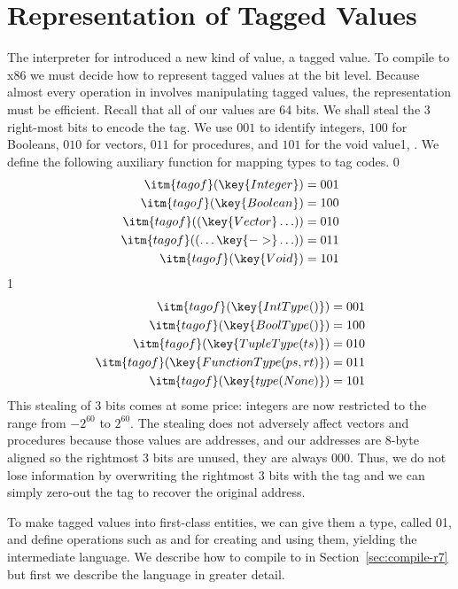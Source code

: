 \documentclass[7x10,nocrop]{TimesAPriori_MIT}%
\def\racketEd{0}
\def\pythonEd{1}
\def\edition{0}
\newcommand{\racket}[1]{{\if\edition\racketEd{#1}\fi}}
\newcommand{\python}[1]{{\if\edition\pythonEd #1\fi}}
\begin{document}
\clearpage

\section{Representation of Tagged Values}

The interpreter for \LangDyn{} introduced a new kind of value, a tagged
value. To compile \LangDyn{} to x86 we must decide how to represent tagged
values at the bit level. Because almost every operation in \LangDyn{}
involves manipulating tagged values, the representation must be
efficient. Recall that all of our values are 64 bits.  We shall steal
the 3 right-most bits to encode the tag.  We use $001$ to identify
integers, $100$ for Booleans, $010$ for vectors, $011$ for procedures,
and $101$ for the void value\python{, }. We define the following auxiliary
function for mapping types to tag codes.
{\if\edition\racketEd
\begin{align*}
\itm{tagof}(\key{Integer}) &= 001 \\
\itm{tagof}(\key{Boolean}) &= 100 \\
\itm{tagof}((\key{Vector} \ldots)) &= 010 \\
\itm{tagof}((\ldots \key{->} \ldots)) &= 011 \\
\itm{tagof}(\key{Void}) &= 101
\end{align*}
\fi}
{\if\edition\pythonEd
\begin{align*}
\itm{tagof}(\key{IntType()}) &= 001 \\
\itm{tagof}(\key{BoolType()}) &= 100 \\
\itm{tagof}(\key{TupleType(ts)}) &= 010 \\
\itm{tagof}(\key{FunctionType(ps, rt)}) &= 011 \\
\itm{tagof}(\key{type(None)}) &= 101
\end{align*}
\fi}
This stealing of 3 bits comes at some price: integers are now restricted
to the range from $-2^{60}$ to $2^{60}$. The stealing does not adversely
affect vectors and procedures because those values are addresses, and
our addresses are 8-byte aligned so the rightmost 3 bits are unused,
they are always $000$. Thus, we do not lose information by overwriting
the rightmost 3 bits with the tag and we can simply zero-out the tag
to recover the original address.

To make tagged values into first-class entities, we can give them a
type, called \racket{}\python{}, and define operations
such as  and  for creating and using them,
yielding the \LangAny{} intermediate language. We describe how to
compile \LangDyn{} to \LangAny{} in Section~\ref{sec:compile-r7}
but first we describe the \LangAny{} language in greater detail.
\end{document}
